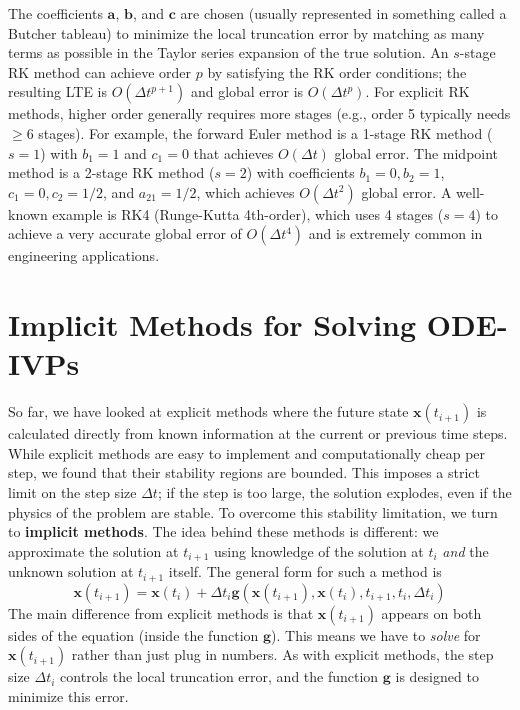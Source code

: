 The coefficients $\mathbf{a}$, $\mathbf{b}$, and $\mathbf{c}$ are chosen (usually represented in something called a Butcher tableau) to minimize the local truncation error by matching as many terms as possible in the Taylor series expansion of the true solution. An $s$-stage RK method can achieve order $p$ by satisfying the RK order conditions; the resulting LTE is $O(\Delta t^{p+1})$ and global error is $O(\Delta t^{p})$. For explicit RK methods, higher order generally requires more stages (e.g., order 5 typically needs $\ge 6$ stages). For example, the forward Euler method is a 1-stage RK method ($s=1$) with $b_1=1$ and $c_1=0$ that achieves $O(\Delta t)$ global error. The midpoint method is a 2-stage RK method ($s=2$) with coefficients $b_1=0, b_2=1$, $c_1=0, c_2=1/2$, and $a_{21}=1/2$, which achieves $O(\Delta t^2)$ global error. A well-known example is RK4 (Runge-Kutta 4th-order), which uses 4 stages ($s=4$) to achieve a very accurate global error of $O(\Delta t^4)$ and is extremely common in engineering applications.


\section{Implicit Methods for Solving ODE-IVPs}

So far, we have looked at explicit methods where the future state $\mathbf{x}(t_{i+1})$ is calculated directly from known information at the current or previous time steps. While explicit methods are easy to implement and computationally cheap per step, we found that their stability regions are bounded. This imposes a strict limit on the step size $\Delta t$; if the step is too large, the solution explodes, even if the physics of the problem are stable. To overcome this stability limitation, we turn to \textbf{implicit methods}. The idea behind these methods is different: we approximate the solution at $t_{i+1}$ using knowledge of the solution at $t_i$ \textit{and} the unknown solution at $t_{i+1}$ itself. The general form for such a method is
\begin{equation}
    \mathbf{x}(t_{i+1}) = \mathbf{x}(t_i) + \Delta t_i \mathbf{g}(\mathbf{x}(t_{i+1}), \mathbf{x}(t_i), t_{i+1}, t_i, \Delta t_i)
\end{equation}
The main difference from explicit methods is that $\mathbf{x}(t_{i+1})$ appears on both sides of the equation (inside the function $\mathbf{g}$). This means we have to \textit{solve} for $\mathbf{x}(t_{i+1})$ rather than just plug in numbers. As with explicit methods, the step size $\Delta t_i$ controls the local truncation error, and the function $\mathbf{g}$ is designed to minimize this error.

